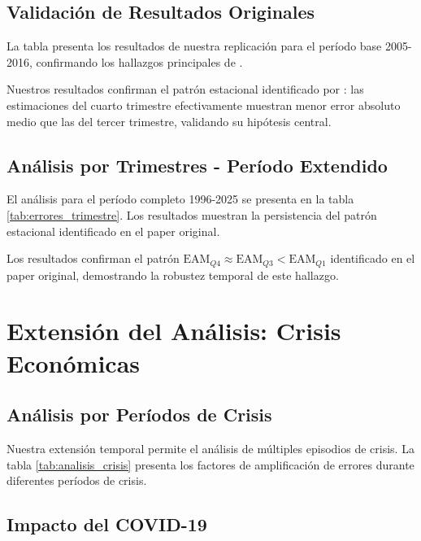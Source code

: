 \documentclass[12pt,a4paper]{article}
\begin{document}
\subsection{Validación de Resultados Originales}

La tabla presenta los resultados de nuestra replicación para el período base 2005-2016, confirmando los hallazgos principales de \citet{pavia2017}.



Nuestros resultados confirman el patrón estacional identificado por \citet{pavia2017}: las estimaciones del cuarto trimestre efectivamente muestran menor error absoluto medio que las del tercer trimestre, validando su hipótesis central.

\subsection{Análisis por Trimestres - Período Extendido}

El análisis para el período completo 1996-2025 se presenta en la tabla \ref{tab:errores_trimestre}. Los resultados muestran la persistencia del patrón estacional identificado en el paper original.



Los resultados confirman el patrón $\text{EAM}_{Q4} \approx \text{EAM}_{Q3} < \text{EAM}_{Q1}$ identificado en el paper original, demostrando la robustez temporal de este hallazgo.

\section{Extensión del Análisis: Crisis Económicas}

\subsection{Análisis por Períodos de Crisis}

Nuestra extensión temporal permite el análisis de múltiples episodios de crisis. La tabla \ref{tab:analisis_crisis} presenta los factores de amplificación de errores durante diferentes períodos de crisis.



\subsection{Impacto del COVID-19}
\end{document}
